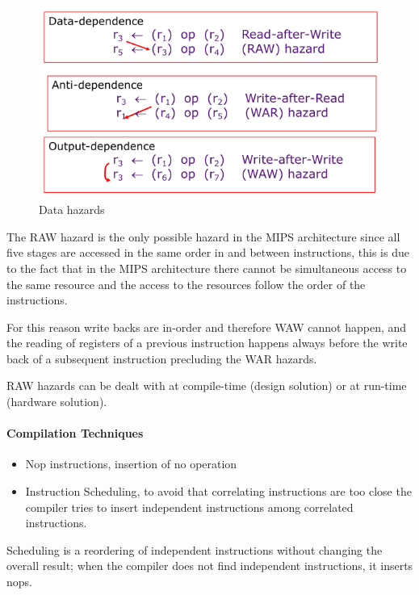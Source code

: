 \begin{figure}
    \centering
    \includegraphics[scale = 0.4]{images/data-hazards-1}
    \caption{Data hazards}
    \label{fig:data-hazards}
\end{figure}


The RAW hazard is the only possible hazard in the MIPS architecture since all five stages are accessed in the
same order in and between instructions, this is due to the fact that in the MIPS architecture there cannot
be simultaneous access to the same resource and the access to the resources follow the order of the instructions.

For this reason write backs are in-order and therefore WAW cannot happen, and the reading of registers of a previous
instruction happens always before the write back of a subsequent instruction precluding the WAR hazards.

RAW hazards can be dealt with at compile-time (design solution) or at run-time (hardware solution).

\paragraph{Compilation Techniques}
\begin{itemize}
    \item[\textrightarrow] Nop instructions, insertion of no operation
    \item[\textrightarrow] Instruction Scheduling, to avoid that correlating instructions are too close the compiler
    tries to insert independent instructions among correlated instructions.
\end{itemize}
Scheduling is a reordering of independent instructions without changing the overall result;
when the compiler does not find independent instructions, it inserts nops.

